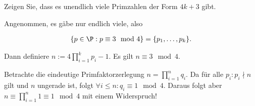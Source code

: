 
\begin{exercise}

Zeigen Sie, dass es unendlich viele Primzahlen der Form $4k+3$ gibt.

\end{exercise}


\begin{solution}

Angenommen, es gäbe nur endlich viele, also

\begin{align*}
    \{p \in \P: p \equiv 3 \mod{4}\} = \{p_1,\dots,p_k\}.
\end{align*}

Dann definiere $n := 4\prod_{i=1}^k p_i - 1$. Es gilt $n \equiv 3 \mod{4}$.

Betrachte die eindeutige Primfaktorzerlegung $n = \prod_{i=1}^n q_i$.
Da für alle $p_i: p_i \nmid n$ gilt und $n$ ungerade ist, folgt
$\forall i \leq n: q_i \equiv 1 \mod{4}$.
Daraus folgt aber $n \equiv \prod_{i=1}^n 1 \equiv 1 \mod{4}$ mit einem
Widerspruch!

\end{solution}

